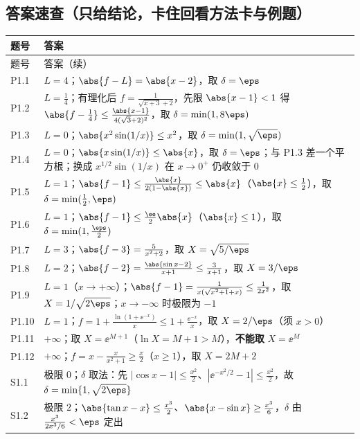 \documentclass[11pt,a4paper]{ctexart}
\begin{document}
\subsection{答案速查（只给结论，卡住回看方法卡与例题）}
{\footnotesize
\begin{longtable}{@{}p{1.6cm}p{13.0cm}@{}}
\toprule 题号 & 答案 \\ \midrule
\endfirsthead
\toprule 题号 & 答案（续） \\ \midrule
\endhead
\midrule
\endfoot
\bottomrule
\endlastfoot
P1.1 & $L=4$；$\abs{f-L}=\abs{x-2}$，取 $\delta=\eps$ \\
P1.2 & $L=\frac{1}{4}$；有理化后 $f=\frac{1}{\sqrt{x+3}+2}$，先限 $\abs{x-1}<1$ 得 $\abs{f-\frac{1}{4}}\le \frac{\abs{x-1}}{4(\sqrt{3}+2)^{2}}$，取 $\delta=\min(1,8\eps)$ \\
P1.3 & $L=0$；$\abs{x^{2}\sin(1/x)}\le x^{2}$，取 $\delta=\min(1,\sqrt{\eps})$ \\
P1.4 & $L=0$；$\abs{x\sin(1/x)}\le \abs{x}$，取 $\delta=\eps$；与 P1.3 差一个平方根；换成 $x^{1/2}\sin(1/x)$ 在 $x\to0^{+}$ 仍收敛于 0 \\
P1.5 & $L=1$；$\abs{f-1}\le \frac{\abs{x}}{2(1-\abs{x})}\le \abs{x}$（$\abs{x}\le\frac{1}{2}$），取 $\delta=\min(\frac{1}{2},\eps)$ \\
P1.6 & $L=1$；$\abs{f-1}\le \frac{\ee}{2}\abs{x}$（$\abs{x}\le 1$），取 $\delta=\min(1,\frac{\eps}{2})$ \\
P1.7 & $L=3$；$\abs{f-3}=\frac{5}{x^{2}+2}$，取 $X=\sqrt{5/\eps}$ \\
P1.8 & $L=2$；$\abs{f-2}=\frac{\abs{\sin x-2}}{x+1}\le \frac{3}{x+1}$，取 $X=3/\eps$ \\
P1.9 & $L=1$（$x\to+\infty$）；$\abs{f-1}=\frac{1}{x(\sqrt{x^{2}+1}+x)}\le\frac{1}{2x^{2}}$，取 $X=1/\sqrt{2\eps}$；$x\to-\infty$ 时极限为 $-1$ \\
P1.10 & $L=1$；$f=1+\frac{\ln(1+\ee^{-x})}{x}\le 1+\frac{\ee^{-x}}{x}$，取 $X=2/\eps$（须 $x>0$） \\
P1.11 & $+\infty$；取 $X=\ee^{M+1}$（$\ln X=M+1>M$），\textbf{不能取} $X=\ee^{M}$ \\
P1.12 & $+\infty$；$f=x-\frac{x}{x^{2}+1}\ge \frac{x}{2}$（$x\ge1$），取 $X=2M+2$ \\
S1.1 & 极限 $0$；$\delta$ 取法：先 $|\cos x-1|\leq\frac{x^{2}}{2}$、$|\ee^{-x^{2}/2}-1|\leq\frac{x^{2}}{2}$，故 $\delta=\min\{1,\sqrt{2\eps}\}$ \\
S1.2 & 极限 $2$；$\abs{\tan x-x}\leq\frac{x^{3}}{2}$、$\abs{x-\sin x}\geq\frac{x^{3}}{6}$，$\delta$ 由 $\frac{x^{3}}{2x^{3}/6}<\eps$ 定出 \\

\end{longtable}}
\end{document}
